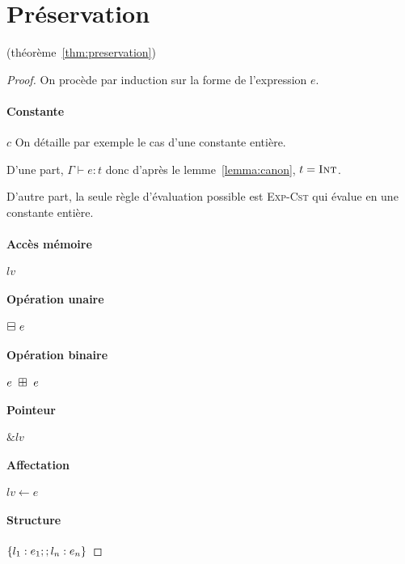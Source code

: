 \section{Préservation}
\label{proof:preservation}

(théorème~\ref{thm:preservation})


\begin{proof}

On procède par induction sur la forme de l'expression $e$.

\paragraph{ Constante }             $c$ %
On détaille par exemple le cas d'une constante entière.

D'une part, $Γ ⊢ e : t$ donc d'après le lemme~\ref{lemma:canon}, $t = \textsc{Int}$.

D'autre part, la seule règle d'évaluation possible est \textsc{Exp-Cst} qui
évalue en une constante entière.


\paragraph{ Accès mémoire }         $ lv $ %

\paragraph{ Opération unaire }      $ \boxminus~e $ %


\paragraph{ Opération binaire }     $ e~\boxplus~e $ %

\paragraph{ Pointeur }              $ \& lv $ %

\paragraph{ Affectation }           $ lv ← e $ %

\paragraph{ Structure }             $ \{ l_1 : e_1 ; ; l_n : e_n \} $ %


\end{proof}
